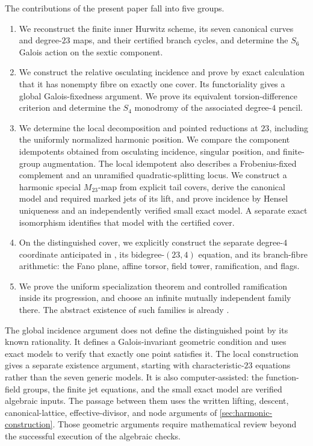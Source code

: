 \documentclass[11pt]{amsart}
\theoremstyle{definition}
\theoremstyle{remark}
\begin{document}
The contributions of the present paper fall into five groups.
\begin{enumerate}
\item We reconstruct the finite inner Hurwitz scheme, its seven
  canonical curves and degree-$23$ maps, and their certified branch
  cycles, and determine the $S_6$ Galois action on the sextic component.
\item We construct the relative osculating incidence and prove by exact
  calculation that it has nonempty fibre on exactly one cover.
  Its functoriality gives a global Galois-fixedness argument.
  We prove its equivalent torsion-difference criterion and determine
  the $S_4$ monodromy of the associated degree-$4$ pencil.
\item We determine the local decomposition and pointed reductions at
  $23$, including the uniformly normalized harmonic position.
  We compare the component idempotents obtained from osculating
  incidence, singular position, and finite-group augmentation.
  The local idempotent also describes a Frobenius-fixed complement
  and an unramified quadratic-splitting locus.
  We construct a harmonic special $M_{23}$-map from explicit tail
  covers, derive the canonical model and required marked jets of
  its lift, and prove incidence by Hensel uniqueness and an
  independently verified small exact model.  A separate exact
  isomorphism identifies that model with the certified cover.
\item On the distinguished cover, we explicitly construct the
  separate degree-$4$ coordinate anticipated in
  \cite[Remark~3.4]{HJLPPZ}, its bidegree-$(23,4)$ equation,
  and its branch-fibre arithmetic: the Fano plane, affine torsor,
  field tower, ramification, and flags.
\item We prove the uniform specialization theorem and controlled
  ramification inside its progression, and choose an infinite
  mutually independent family there.
  The abstract existence of such families is already
  \cite[Corollary~1.4(d)]{HJLPPZ}.
\end{enumerate}

The global incidence argument does not define the distinguished point
by its known rationality.  It defines a Galois-invariant geometric
condition and uses exact models to verify that exactly one point
satisfies it.  The local construction gives a separate existence
argument, starting with characteristic-$23$ equations rather than
the seven generic models.  It is also computer-assisted: the
function-field groups, the finite jet equations, and the small exact
model are verified algebraic inputs.  The passage between them uses
the written lifting, descent, canonical-lattice, effective-divisor,
and node arguments of \cref{sec:harmonic-construction}.
Those geometric arguments require mathematical review beyond the
successful execution of the algebraic checks.
\end{document}
